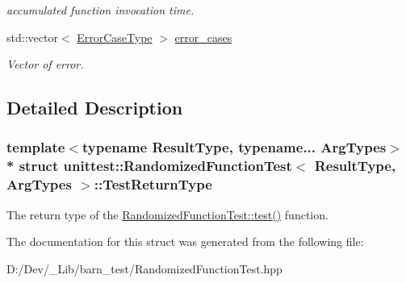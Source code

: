 \begin{DoxyCompactItemize}
\begin{DoxyCompactList}\small\item\em accumulated function invocation time. \end{DoxyCompactList}\item 
std\+::vector$<$ \hyperlink{structunittest_1_1_randomized_function_test_1_1_error_case_type}{Error\+Case\+Type} $>$ \hyperlink{structunittest_1_1_randomized_function_test_1_1_test_return_type_af80bd2e70186eb9b9752dad1512ebbaa}{error\+\_\+cases}\hypertarget{structunittest_1_1_randomized_function_test_1_1_test_return_type_af80bd2e70186eb9b9752dad1512ebbaa}{}\label{structunittest_1_1_randomized_function_test_1_1_test_return_type_af80bd2e70186eb9b9752dad1512ebbaa}

\begin{DoxyCompactList}\small\item\em Vector of error. \end{DoxyCompactList}\end{DoxyCompactItemize}


\subsection{Detailed Description}
\subsubsection*{template$<$typename Result\+Type, typename... Arg\+Types$>$\\*
struct unittest\+::\+Randomized\+Function\+Test$<$ Result\+Type, Arg\+Types $>$\+::\+Test\+Return\+Type}

The return type of the \hyperlink{classunittest_1_1_randomized_function_test_a7e4f4b28b4487e4cdd445faf4f4b0ca5}{Randomized\+Function\+Test\+::test()} function. 

The documentation for this struct was generated from the following file\+:\begin{DoxyCompactItemize}
\item 
D\+:/\+Dev/\+\_\+\+Lib/barn\+\_\+test/Randomized\+Function\+Test.\+hpp\end{DoxyCompactItemize}
